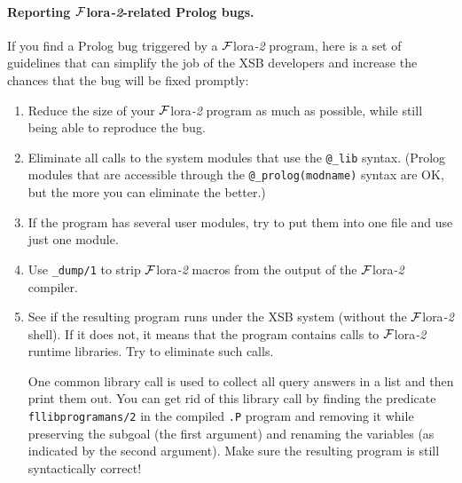 \documentclass[11pt]{article}
\newcommand{\FLORA}{{\mbox{\sc ${\cal F}${lora}\rm\emph{-2}}}\xspace}
\begin{document}
\paragraph{Reporting \FLORA-related Prolog bugs.}
If you find a Prolog bug triggered by a \FLORA program, here is a set of
guidelines that can simplify the job of the XSB developers and increase the
chances that the bug will be fixed promptly:
\begin{enumerate}
  \item  Reduce the size of your \FLORA program as much as possible, while
    still being able to reproduce the bug.
  \item  Eliminate all calls to the system modules that use the
    {\tt @\_lib} syntax. (Prolog modules that are accessible
    through the {\tt @\_prolog(modname)} syntax are OK, but the more you can
    eliminate the better.)
  \item If the program has several user modules, try to put them into one
    file and use just one module. 
  \item  Use {\tt \_dump/1} to strip \FLORA macros from the output of the
    \FLORA compiler.
  \item  See if the resulting program runs under the XSB system (without
    the \FLORA shell). If it does not, it means that the program contains
    calls to \FLORA runtime libraries. Try to eliminate such calls.

    One common library call is used to collect all query answers in a list
    and then print them out. You can get rid of this library call by
    finding the predicate {\tt fllibprogramans/2} in the compiled {\tt .P}
    program and removing it while preserving the subgoal (the first
    argument) and renaming the variables (as indicated by the second argument).
    Make sure the resulting program is still syntactically correct!


\end{enumerate}
\end{document}
